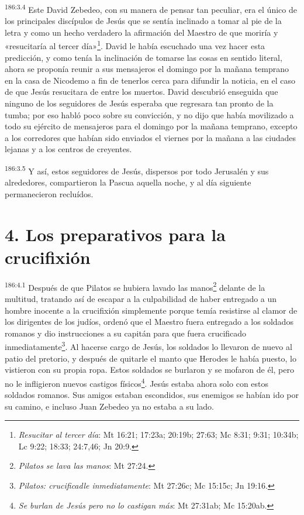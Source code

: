 \par 
\textsuperscript{186:3.4} Este David Zebedeo, con su manera de pensar tan peculiar, era el único de los principales discípulos de Jesús que se sentía inclinado a tomar al pie de la letra y como un hecho verdadero la afirmación del Maestro de que moriría y «resucitaría al tercer día»\footnote{\textit{Resucitar al tercer día}: Mt 16:21; 17:23a; 20:19b; 27:63; Mc 8:31; 9:31; 10:34b; Lc 9:22; 18:33; 24:7,46; Jn 20:9.}. David le había escuchado una vez hacer esta predicción, y como tenía la inclinación de tomarse las cosas en sentido literal, ahora se proponía reunir a sus mensajeros el domingo por la mañana temprano en la casa de Nicodemo a fin de tenerlos cerca para difundir la noticia, en el caso de que Jesús resucitara de entre los muertos. David descubrió enseguida que ninguno de los seguidores de Jesús esperaba que regresara tan pronto de la tumba; por eso habló poco sobre su convicción, y no dijo que había movilizado a todo su ejército de mensajeros para el domingo por la mañana temprano, excepto a los corredores que habían sido enviados el viernes por la mañana a las ciudades lejanas y a los centros de creyentes.

\par 
\textsuperscript{186:3.5} Y así, estos seguidores de Jesús, dispersos por todo Jerusalén y sus alrededores, compartieron la Pascua aquella noche, y al día siguiente permanecieron recluídos.

\section*{4. Los preparativos para la crucifixión}
\par 
\textsuperscript{186:4.1} Después de que Pilatos se hubiera lavado las manos\footnote{\textit{Pilatos se lava las manos}: Mt 27:24.} delante de la multitud, tratando así de escapar a la culpabilidad de haber entregado a un hombre inocente a la crucifixión simplemente porque temía resistirse al clamor de los dirigentes de los judíos, ordenó que el Maestro fuera entregado a los soldados romanos y dio instrucciones a su capitán para que fuera crucificado inmediatamente\footnote{\textit{Pilatos: crucificadle inmediatamente}: Mt 27:26c; Mc 15:15c; Jn 19:16.}. Al hacerse cargo de Jesús, los soldados lo llevaron de nuevo al patio del pretorio, y después de quitarle el manto que Herodes le había puesto, lo vistieron con su propia ropa. Estos soldados se burlaron y se mofaron de él, pero no le infligieron nuevos castigos físicos\footnote{\textit{Se burlan de Jesús pero no lo castigan más}: Mt 27:31ab; Mc 15:20ab.}. Jesús estaba ahora solo con estos soldados romanos. Sus amigos estaban escondidos, sus enemigos se habían ido por su camino, e incluso Juan Zebedeo ya no estaba a su lado.

